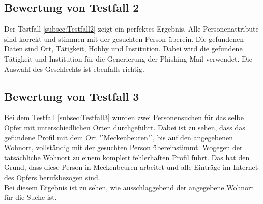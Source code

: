 	\subsection{Bewertung von Testfall 2}
	Der Testfall \ref{subsec:Testfall2} zeigt ein perfektes Ergebnis. Alle Personenattribute sind korrekt und stimmen mit der gesuchten Person überein. Die gefundenen Daten sind Ort, Tätigkeit, Hobby und Institution. Dabei wird die gefundene Tätigkeit und Institution für die Generierung der Phishing-Mail verwendet. Die Auswahl des Geschlechts ist ebenfalls richtig.
	\subsection{Bewertung von Testfall 3}
	Bei dem Testfall \ref{subsec:Testfall3} wurden zwei Personensuchen für das selbe Opfer mit unterschiedlichen Orten durchgeführt. Dabei ist zu sehen, dass das gefundene Profil mit dem Ort "'Meckenbeuren"', bis auf den angegebenen Wohnort, vollständig mit der gesuchten Person übereinstimmt. Wogegen der tatsächliche Wohnort zu einem komplett fehlerhaften Profil führt. Das hat den Grund, dass diese Person in Meckenbeuren arbeitet und alle Einträge im Internet des Opfers berufsbezogen sind.\\
	Bei diesem Ergebnis ist zu sehen, wie ausschlaggebend der angegebene Wohnort für die Suche ist.
